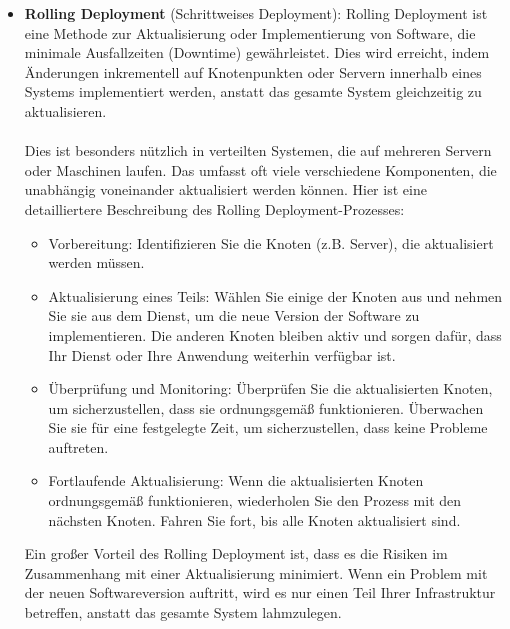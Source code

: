 \begin{itemize} 
\item \textbf{Rolling Deployment} (Schrittweises Deployment):
Rolling Deployment ist eine Methode zur Aktualisierung oder Implementierung von Software, die minimale Ausfallzeiten (Downtime) gewährleistet. Dies wird erreicht, indem Änderungen inkrementell auf Knotenpunkten oder Servern innerhalb eines Systems implementiert werden, anstatt das gesamte System gleichzeitig zu aktualisieren.
\\\\
Dies ist besonders nützlich in verteilten Systemen, die auf mehreren Servern oder Maschinen laufen. Das umfasst oft viele verschiedene Komponenten, die unabhängig voneinander aktualisiert werden können.
Hier ist eine detailliertere Beschreibung des Rolling Deployment-Prozesses:
\begin{itemize} 
\item Vorbereitung: Identifizieren Sie die Knoten (z.B. Server), die aktualisiert werden müssen.
\item Aktualisierung eines Teils: Wählen Sie einige der Knoten aus und nehmen Sie sie aus dem Dienst, um die neue Version der Software zu implementieren. Die anderen Knoten bleiben aktiv und sorgen dafür, dass Ihr Dienst oder Ihre Anwendung weiterhin verfügbar ist.
\item Überprüfung und Monitoring: Überprüfen Sie die aktualisierten Knoten, um sicherzustellen, dass sie ordnungsgemäß funktionieren. Überwachen Sie sie für eine festgelegte Zeit, um sicherzustellen, dass keine Probleme auftreten.
\item Fortlaufende Aktualisierung: Wenn die aktualisierten Knoten ordnungsgemäß funktionieren, wiederholen Sie den Prozess mit den nächsten Knoten. Fahren Sie fort, bis alle Knoten aktualisiert sind.
\end{itemize} 
Ein großer Vorteil des Rolling Deployment ist, dass es die Risiken im Zusammenhang mit einer Aktualisierung minimiert. Wenn ein Problem mit der neuen Softwareversion auftritt, wird es nur einen Teil Ihrer Infrastruktur betreffen, anstatt das gesamte System lahmzulegen.


\end{itemize}
